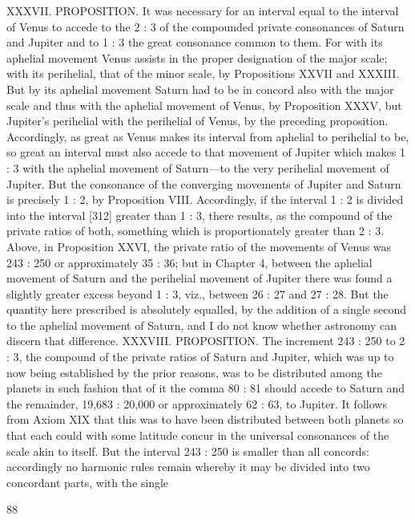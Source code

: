 \documentclass{article}
\begin{document}
XXXVII. PROPOSITION. It was necessary for an interval equal to the
interval of Venus to accede to the 2 : 3 of the compounded private
consonances of Saturn and Jupiter and to 1 : 3 the great consonance
common to them.
For with its aphelial movement Venus assists in the proper designation
of the major scale; with its perihelial, that of the minor scale, by
Propositions XXVII and XXXIII. But by its aphelial movement Saturn
had to be in concord also with the major scale and thus with the aphelial
movement of Venus, by Proposition XXXV, but Jupiter's perihelial with
the perihelial of Venus, by the preceding proposition. Accordingly, as
great as Venus makes its interval from aphelial to perihelial to be, so
great an interval must also accede to that movement of Jupiter which
makes 1 : 3 with the aphelial movement of Saturn—to the very perihelial
movement of Jupiter. But the consonance of the converging movements
of Jupiter and Saturn is precisely 1 : 2, by Proposition VIII. Accordingly,
if the interval 1 : 2 is divided into the interval [312] greater than 1 : 3,
there results, as the compound of the private ratios of both, something
which is proportionately greater than 2 : 3.
Above, in Proposition XXVI, the private ratio of the movements of Venus
was 243 : 250 or approximately 35 : 36; but in Chapter 4, between the
aphelial movement of Saturn and the perihelial movement of Jupiter
there was found a slightly greater excess beyond 1 : 3, viz., between 26 :
27 and 27 : 28. But the quantity here prescribed is absolutely equalled,
by the addition of a single second to the aphelial movement of Saturn,
and I do not know whether astronomy can discern that difference.
XXXVIII. PROPOSITION. The increment 243 : 250 to 2 : 3, the
compound of the private ratios of Saturn and Jupiter, which was up to
now being established by the prior reasons, was to be distributed among
the planets in such fashion that of it the comma 80 : 81 should accede to
Saturn and the remainder, 19,683 : 20,000 or approximately 62 : 63, to
Jupiter.
It follows from Axiom XIX that this was to have been distributed
between both planets so that each could with some latitude concur in the
universal consonances of the scale akin to itself. But the interval 243 :
250 is smaller than all concords: accordingly no harmonic rules remain
whereby it may be divided into two concordant parts, with the single


88
\end{document}
